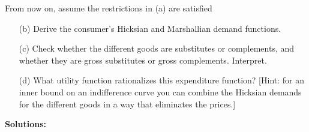 \documentclass[12pt]{article}
\begin{document}
\noindent From now on, assume the restrictions in (a) are satisfied


\begin{itemize}
    \item[(b)] Derive the consumer's Hicksian and Marshallian demand functions. 

    \item[(c)] Check whether the different goods are substitutes or complements, and whether they are gross substitutes or gross complements. Interpret.

    \item[(d)] What utility function rationalizes this expenditure function? [Hint: for an inner bound on an indifference curve you can combine the Hicksian demands for the different goods in a way that eliminates the prices.]
\end{itemize}

\medskip

\textbf{Solutions:}
\end{document}
